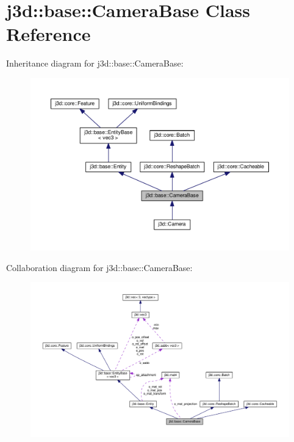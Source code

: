 \hypertarget{classj3d_1_1base_1_1CameraBase}{}\section{j3d\+:\+:base\+:\+:Camera\+Base Class Reference}
\label{classj3d_1_1base_1_1CameraBase}


Inheritance diagram for j3d\+:\+:base\+:\+:Camera\+Base\+:
\nopagebreak
\begin{figure}[H]
\begin{center}
\leavevmode
\includegraphics[width=350pt]{classj3d_1_1base_1_1CameraBase__inherit__graph}
\end{center}
\end{figure}


Collaboration diagram for j3d\+:\+:base\+:\+:Camera\+Base\+:
\nopagebreak
\begin{figure}[H]
\begin{center}
\leavevmode
\includegraphics[width=350pt]{classj3d_1_1base_1_1CameraBase__coll__graph}
\end{center}
\end{figure}
